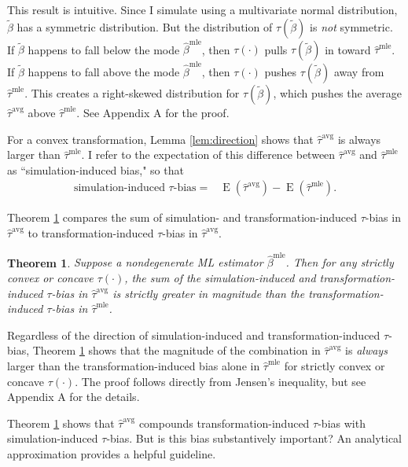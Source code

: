 \documentclass[12pt]{article}
\newtheorem{theorem}{Theorem}
\DeclareMathOperator*{\E}{\text{E}}
\begin{document}
\noindent This result is intuitive. Since I simulate using a multivariate normal distribution, $\tilde{\beta}$ has a symmetric distribution. But the distribution of $\tau(\tilde{\beta})$ is \emph{not} symmetric. If $\tilde{\beta}$ happens to fall below the mode $\hat{\beta}^\text{mle}$, then $\tau(\cdot)$ pulls $\tau(\tilde{\beta})$ in toward $\hat{\tau}^\text{mle}$.
If $\tilde{\beta}$ happens to fall above the mode $\hat{\beta}^\text{mle}$, then $\tau(\cdot)$ pushes $\tau(\tilde{\beta})$ away from $\hat{\tau}^\text{mle}$. This creates a right-skewed distribution for $\tau(\tilde{\beta})$, which pushes the average $\hat{\tau}^\text{avg}$ above $\hat{\tau}^\text{mle}$. See Appendix A for the proof.

For a convex transformation, Lemma \ref{lem:direction} shows that $\hat{\tau}^\text{avg}$ is always larger than $\hat{\tau}^\text{mle}$. I refer to the expectation of this difference between $\hat{\tau}^\text{avg}$ and $\hat{\tau}^\text{mle}$ as ``simulation-induced bias," so that
\begin{align*}
\text{simulation-induced } \tau\text{-bias} =& \E\left(\hat{\tau}^\text{avg} \right) - \E\left(\hat{\tau}^\text{mle} \right).
\end{align*}

Theorem \ref{thm:direction} compares the sum of simulation- and transformation-induced $\tau$-bias in $\hat{\tau}^\text{avg}$ to transformation-induced $\tau$-bias in $\hat{\tau}^\text{avg}$.

\begin{theorem}\label{thm:direction}
Suppose a nondegenerate ML estimator $\hat{\beta}^\text{mle}$.
Then for any strictly convex or concave $\tau(\cdot)$, the sum of the simulation-induced and transformation-induced $\tau$-bias in $\hat{\tau}^{\text{avg}}$ is strictly greater in magnitude than the transformation-induced $\tau$-bias in $\hat{\tau}^{\text{mle}}$.
\end{theorem}

\noindent Regardless of the direction of simulation-induced and transformation-induced $\tau$-bias, Theorem \ref{thm:direction} shows that the magnitude of the combination in $\hat{\tau}^{\text{avg}}$ is \textit{always} larger than the transformation-induced bias alone in  $\hat{\tau}^{\text{mle}}$ for strictly convex or concave $\tau(\cdot)$. The proof follows directly from Jensen's inequality, but see Appendix A for the details.

Theorem \ref{thm:direction} shows that $\hat{\tau}^\text{avg}$ compounds transformation-induced $\tau$-bias with simulation-induced $\tau$-bias. But is this bias substantively important? An analytical approximation provides a helpful guideline.
\end{document}
